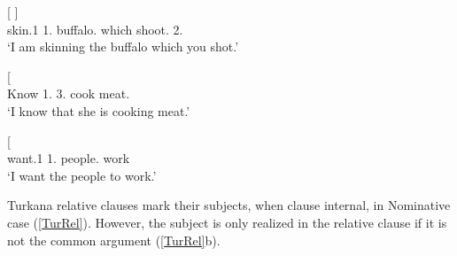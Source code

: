 \begin{exe}\ex\label{MurDep}
\begin{xlist}
\ex\gll{}    {\rm[}  \textbf{}{\rm]}\\
skin.1\sg{} 1\sg{}.\nom{} buffalo.\acc{} \hspaceThis{[}which shoot.\pst{} 2\sg{}.\nom{}\\
\glt `I am skinning the buffalo which you shot.'

\ex\gll{}   {\rm[}\textbf{}  \textipa{idiN}{\rm]}\\
Know 1\sg{}.\nom{} \hspaceThis{[}3\sg{}.\acc{} cook meat.\acc{}\\
\glt `I know that she is cooking meat.'

\ex\gll{}   {\rm[}\textbf{} \textipa{kiliNliNit}{\rm]}\\
want.1\sg{} 1\sg{}.\nom{} \hspaceThis{[}people.\acc{} work\\
\glt `I want the people to work.'
\end{xlist}
\end{exe}
 

Turkana relative clauses mark their subjects, when clause internal, in Nominative  case (\ref{TurRel}).
However, the subject is only realized in the relative clause if it is not the common argument  (\ref{TurRel}b).

